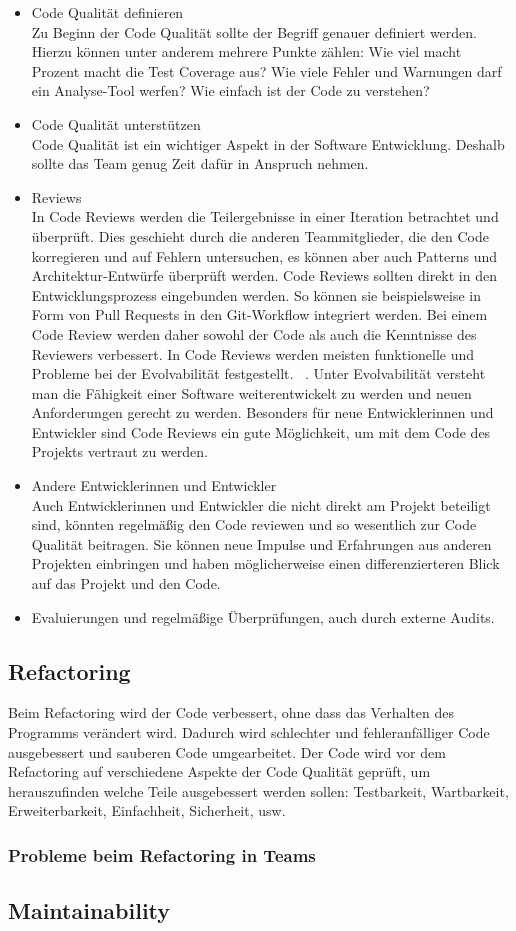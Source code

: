 \begin{itemize} 
\item Code Qualität definieren \\
Zu Beginn der Code Qualität sollte der Begriff genauer definiert werden. Hierzu können unter anderem mehrere Punkte zählen: Wie viel macht Prozent macht die Test Coverage aus? Wie viele Fehler und Warnungen darf ein Analyse-Tool werfen? Wie einfach ist der Code zu verstehen? 
\item Code Qualität unterstützen \\
Code Qualität ist ein wichtiger Aspekt in der Software Entwicklung. Deshalb sollte das Team genug Zeit dafür in Anspruch nehmen.
\item Reviews \\
In Code Reviews werden die Teilergebnisse in einer Iteration betrachtet und überprüft. Dies geschieht durch die anderen Teammitglieder, die den Code korregieren und auf Fehlern untersuchen, es können aber auch Patterns und Architektur-Entwürfe überprüft werden. Code Reviews sollten direkt in den Entwicklungsprozess eingebunden werden. So können sie beispielsweise in Form von Pull Requests in den Git-Workflow integriert werden. Bei einem Code Review werden daher sowohl der Code als auch die Kenntnisse des Reviewers verbessert. 
In Code Reviews werden meisten funktionelle und Probleme bei der Evolvabilität festgestellt. ~\parencite{mantyla2008types}. Unter Evolvabilität versteht man die Fähigkeit einer Software weiterentwickelt zu werden und neuen Anforderungen gerecht zu werden. Besonders für neue Entwicklerinnen und Entwickler sind Code Reviews ein gute Möglichkeit, um mit dem Code des Projekts vertraut zu werden.
\item Andere Entwicklerinnen und Entwickler \\
Auch Entwicklerinnen und Entwickler die nicht direkt am Projekt beteiligt sind, könnten regelmäßig den Code reviewen und so wesentlich zur Code Qualität beitragen. Sie können neue Impulse und Erfahrungen aus anderen Projekten einbringen und haben möglicherweise einen differenzierteren Blick auf das Projekt und den Code. 
\item Evaluierungen und regelmäßige Überprüfungen, auch durch externe Audits. 
\end{itemize}
\subsection{Refactoring}
Beim Refactoring wird der Code verbessert, ohne dass das Verhalten des Programms verändert wird. Dadurch wird schlechter und fehleranfälliger Code ausgebessert und sauberen Code umgearbeitet. Der Code wird vor dem Refactoring auf verschiedene Aspekte der Code Qualität geprüft, um herauszufinden welche Teile ausgebessert werden sollen: Testbarkeit, Wartbarkeit, Erweiterbarkeit, Einfachheit, Sicherheit, usw.  ~\parencite{fowler2018refactoring}
\subsubsection{Probleme beim Refactoring in Teams}
\subsection{Maintainability}
\chapterend